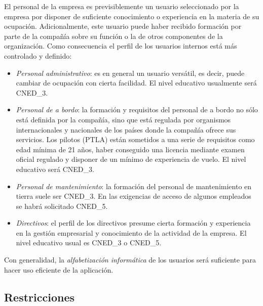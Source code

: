 \documentclass[11pt, a4paper, twoside]{report}
\begin{document}
			El personal de la empresa es previsiblemente un usuario seleccionado por la empresa por disponer de suficiente conocimiento o experiencia en la materia de su ocupación. Adicionalmente, este usuario puede haber recibido formación por parte de la compañía sobre su función o la de otros componentes de la organización. Como consecuencia el perfil de los usuarios internos está más controlado y definido:
			\begin{itemize}
				\item \textit{Personal administrativo}: es en general un usuario versátil, es decir, puede cambiar de ocupación con cierta facilidad. El nivel educativo usualmente será \gls{CNED_3}.
				\item \textit{Personal de a bordo}: la formación y requisitos del personal de a bordo no sólo está definida por la compañía, sino que está regulada por organismos internacionales y nacionales de los países donde la compañía ofrece sus servicios. Los pilotos  (\gls{PTLA}) están sometidos a una serie de requisitos como edad mínima de 21 años, haber conseguido una licencia mediante examen oficial regulado y disponer de un mínimo de experiencia de vuelo. El nivel educativo será \gls{CNED_3}.
				\item \textit{Personal de mantenimiento}: la formación del personal de mantenimiento en tierra suele ser \gls{CNED_3}. En las exigencias de acceso de algunos empleados se habrá solicitado \gls{CNED_5}.
				\item \textit{Directivos}: el perfil de los directivos presume cierta formación y experiencia en la gestión empresarial y conocimiento de la actividad de la empresa. El nivel educativo usual es \gls{CNED_3} o \gls{CNED_5}.
			\end{itemize}

			Con generalidad, la \textit{alfabetización informática} de los usuarios será suficiente para hacer uso eficiente de la aplicación.

		\subsection{Restricciones}
\end{document}

